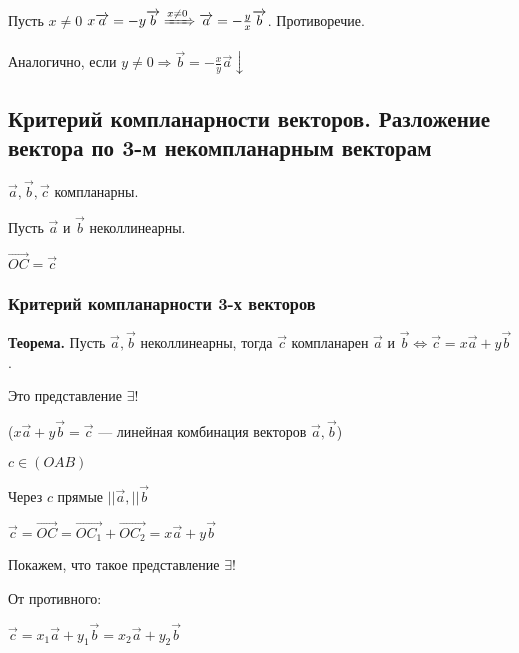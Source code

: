 \documentclass{article}
\begin{document}
    Пусть \( x \neq 0 \)  \( x\overrightarrow{a} = -y\overrightarrow{b} \xRightarrow[]{x \neq 0} \overrightarrow{a} = -\frac{y}{x}\overrightarrow{b} \). Противоречие.

    Аналогично, если \( y \neq 0 \Rightarrow \overrightarrow{b} = -\frac{x}{y}\overrightarrow{a} \downarrow \)
    
    \subsection{Критерий компланарности векторов. Разложение вектора по 3-м некомпланарным векторам}

    \(\overrightarrow{a}, \overrightarrow{b}, \overrightarrow{c}\) компланарны.

    Пусть \(\overrightarrow{a}\) и \(\overrightarrow{b}\) неколлинеарны.

    
    \( \overrightarrow{OC} = \overrightarrow{c} \)

    \subsubsection{Критерий компланарности 3-х векторов}
    
    \textbf{Теорема.} Пусть \(\overrightarrow{a}, \overrightarrow{b}\) неколлинеарны, тогда \(\overrightarrow{c}\) компланарен \(\overrightarrow{a}\) и \(\overrightarrow{b} \Leftrightarrow \overrightarrow{c} = x\overrightarrow{a} + y\overrightarrow{b}\).

    Это представление \(\exists!\)

    (\(x\overrightarrow{a} + y\overrightarrow{b} = \overrightarrow{c}\) --- линейная комбинация векторов \(\overrightarrow{a}, \overrightarrow{b}\))


    \( c \in (OAB) \)

    Через \( c \) прямые \(|| \overrightarrow{a}, || \overrightarrow{b}\)

    \( \overrightarrow{c} = \overrightarrow{OC} = \overrightarrow{OC_1} + \overrightarrow{OC_2} = x\overrightarrow{a} + y\overrightarrow{b} \)

    Покажем, что такое представление \(\exists!\)

    От противного:

    \(\overrightarrow{c} = x_1\overrightarrow{a} + y_1\overrightarrow{b} = x_2\overrightarrow{a} + y_2\overrightarrow{b}\)
\end{document}
